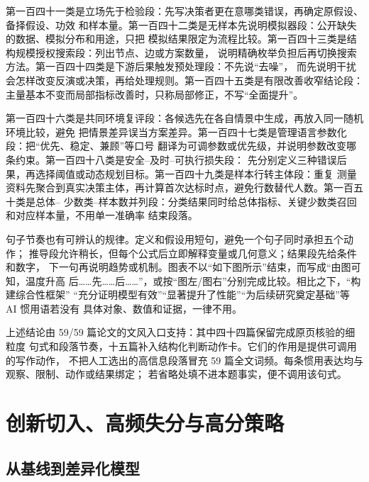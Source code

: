 \documentclass[UTF8,a4paper,12pt]{ctexart}
\begin{document}
第一百四十一类是立场先于检验段：先写决策者更在意哪类错误，再确定原假设、备择假设、功效
和样本量。第一百四十二类是无样本先说明模拟器段：公开缺失的数据、模拟分布和用途，只把
模拟结果限定为流程比较。第一百四十三类是结构规模授权搜索段：列出节点、边或方案数量，
说明精确枚举负担后再切换搜索方法。第一百四十四类是下游后果触发预处理段：不先说“去噪”，
而先说明干扰会怎样改变反演或决策，再给处理规则。第一百四十五类是有限改善收窄结论段：
主量基本不变而局部指标改善时，只称局部修正，不写“全面提升”。

第一百四十六类是共同环境复评段：各候选先在各自情景中生成，再放入同一随机环境比较，避免
把情景差异误当方案差异。第一百四十七类是管理语言参数化段：把“优先、稳定、兼顾”等口号
翻译为可调参数或优先级，并说明参数改变哪条约束。第一百四十八类是安全--及时--可执行损失段：
先分别定义三种错误后果，再选择阈值或动态规划目标。第一百四十九类是样本行转主体段：重复
测量资料先聚合到真实决策主体，再计算首次达标时点，避免行数替代人数。第一百五十类是总体--
少数类--样本数并列段：分类结果同时给总体指标、关键少数类召回和对应样本量，不用单一准确率
结束段落。

句子节奏也有可辨认的规律。定义和假设用短句，避免一个句子同时承担五个动作；
推导段允许稍长，但每个公式后立即解释变量或几何意义；结果段先给条件和数字，
下一句再说明趋势或机制。图表不以“如下图所示”结束，而写成“由图可知，温度升高
后……先……后……”，或按“图左/图右”分别完成比较。相比之下，“构建综合性框架”
“充分证明模型有效”“显著提升了性能”“为后续研究奠定基础”等 AI 惯用语若没有
具体对象、数值和证据，一律不用。

上述结论由 59/59 篇论文的文风入口支持：其中四十四篇保留完成原页核验的细粒度
句式和段落节奏，十五篇补入结构化判断动作卡。它们的作用是提供可调用的写作动作，
不把人工选出的高信息段落冒充 59 篇全文词频。每条惯用表达均与观察、限制、动作或结果绑定；
若省略处填不进本题事实，便不调用该句式。

\section{创新切入、高频失分与高分策略}

\subsection{从基线到差异化模型}
\end{document}

